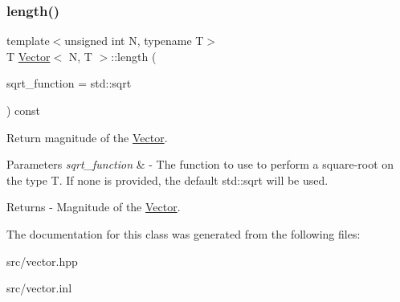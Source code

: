 \subsubsection{\texorpdfstring{length()}{length()}}
{\footnotesize\ttfamily template$<$unsigned int N, typename T$>$ \\
T \mbox{\hyperlink{class_vector}{Vector}}$<$ N, T $>$\+::length (\begin{DoxyParamCaption}\item[{std\+::function$<$ T(T)$>$}]{sqrt\+\_\+function = {\ttfamily std\+:\+:sqrt} }\end{DoxyParamCaption}) const}

Return magnitude of the \mbox{\hyperlink{class_vector}{Vector}}. 
\begin{DoxyParams}{Parameters}
{\em sqrt\+\_\+function} & -\/ The function to use to perform a square-\/root on the type T. If none is provided, the default std\+::sqrt will be used. \\
\hline
\end{DoxyParams}
\begin{DoxyReturn}{Returns}
-\/ Magnitude of the \mbox{\hyperlink{class_vector}{Vector}}. 
\end{DoxyReturn}


The documentation for this class was generated from the following files\+:\begin{DoxyCompactItemize}
\item 
src/vector.\+hpp\item 
src/vector.\+inl\end{DoxyCompactItemize}

